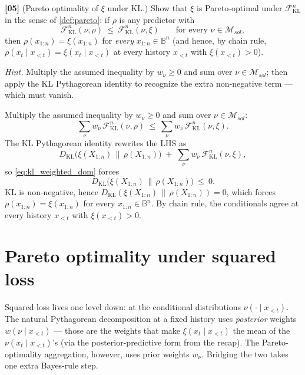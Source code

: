 \documentclass[fontsize=11pt, parskip=half]{scrartcl}
\theoremstyle{definition}
\newenvironment{solution}{%
    \begin{tcolorbox}[colback=black!5!white, colframe=black!50!white,
      title={\textbf{Solution}}, fonttitle=\normalfont, breakable]
  }{\end{tcolorbox}}
\newenvironment{solution}{\expandafter\comment}{\expandafter\endcomment}
\newcommand{\Msol}{\mathcal{M}_{sol}}
\newcommand{\KL}{D_{\text{KL}}}
\newcommand{\FKL}{\mathcal{F}_{\text{KL}}}
\begin{document}
\bigskip

\noindent
\textbf{[05]} (Pareto optimality of $\xi$ under KL.) Show that $\xi$ is
Pareto-optimal under $\FKL^n$ in the sense of \cref{def:pareto}: if $\rho$ is
any predictor with
\[
  \FKL^n(\nu, \rho) ~\leq~ \FKL^n(\nu, \xi) \qquad \text{for every } \nu \in \Msol,
\]
then $\rho(x_{1:n}) = \xi(x_{1:n})$ for \emph{every} $x_{1:n} \in \mathbb{B}^n$
(and hence, by chain rule, $\rho(x_t \mid x_{<t}) = \xi(x_t \mid x_{<t})$ at
every history $x_{<t}$ with $\xi(x_{<t}) > 0$).

\textit{Hint.} Multiply the assumed inequality by $w_\nu \geq 0$ and sum over
$\nu \in \Msol$; then apply the KL Pythagorean identity to recognize the extra
non-negative term --- which must vanish.

\begin{solution}
Multiply the assumed inequality by $w_\nu \geq 0$ and sum over $\nu \in \Msol$:
\begin{equation}\label{eq:kl_weighted_dom}
  \sum_\nu w_\nu\,\FKL^n(\nu, \rho)
  ~\leq~
  \sum_\nu w_\nu\,\FKL^n(\nu, \xi).
\end{equation}
The KL Pythagorean identity rewrites the LHS as
\[
  \KL\bigl(\xi(X_{1:n}) \,\big\|\, \rho(X_{1:n})\bigr) \;+\;
  \sum_\nu w_\nu\,\FKL^n(\nu, \xi),
\]
so \cref{eq:kl_weighted_dom} forces
\[
  \KL\bigl(\xi(X_{1:n}) \,\big\|\, \rho(X_{1:n})\bigr) ~\leq~ 0.
\]
KL is non-negative, hence $\KL(\xi(X_{1:n}) \,\|\, \rho(X_{1:n})) = 0$, which
forces $\rho(x_{1:n}) = \xi(x_{1:n})$ for every $x_{1:n} \in \mathbb{B}^n$. By
chain rule, the conditionals agree at every history $x_{<t}$ with
$\xi(x_{<t}) > 0$. \qedhere
\end{solution}

\section{Pareto optimality under squared loss}\label{prob:sq}

Squared loss lives one level down: at the conditional distributions
$\nu(\cdot \mid x_{<t})$. The natural Pythagorean decomposition at a fixed
history uses \emph{posterior} weights $w(\nu \mid x_{<t})$ --- those are the
weights that make $\xi(x_t \mid x_{<t})$ the mean of the $\nu(x_t \mid x_{<t})$'s
(via the posterior-predictive form from the recap). The Pareto-optimality
aggregation, however, uses prior weights $w_\nu$. Bridging the two takes one
extra Bayes-rule step.

\bigskip
\end{document}
